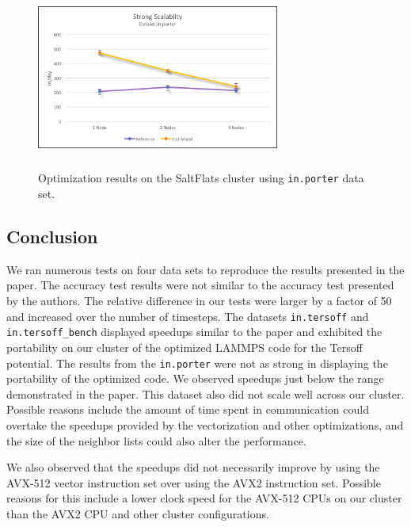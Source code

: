 \documentclass{sig-alternate-05-2015}
\begin{document}
\begin{figure}
\centering
\includegraphics[height=6cm, width=8cm]{ScalingPorter.png}
\caption{Optimization results on the SaltFlats cluster using \texttt{in.porter} data set.}
\vskip -6pt
\end{figure}

\subsection{Conclusion}
We ran numerous tests on four data sets to reproduce the results presented in the paper.  The accuracy test results were not similar to the accuracy test presented by the authors.  The relative difference in our tests were larger by a factor of 50 and increased over the number of timesteps.  The datasets \texttt{in.tersoff} and \texttt{in.tersoff\_bench} displayed speedups similar to the paper and exhibited the portability on our cluster of the optimized LAMMPS code for the Tersoff potential.  The results from the \texttt{in.porter} were not as strong in displaying the portability of the optimized code.  We observed speedups just below the range demonstrated in the paper.  This dataset also did not scale well across our cluster.  Possible reasons include the amount of time spent in communication could overtake the speedups provided by the vectorization and other optimizations, and the size of the neighbor lists could also alter the performance.

We also observed that the speedups did not necessarily improve by using the AVX-512 vector instruction set over using the AVX2 instruction set.  Possible reasons for this include a lower clock speed for the AVX-512 CPUs on our cluster than the AVX2 CPU and other cluster configurations. 

\end{document}
